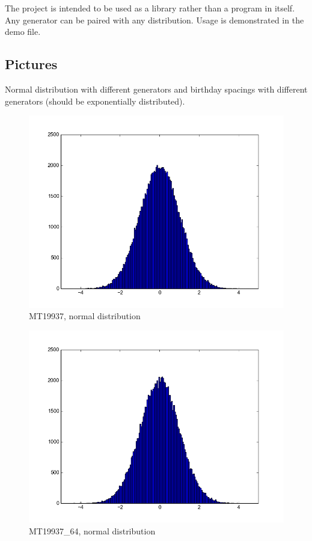 \documentclass[reprint,aip]{revtex4-1}
\begin{document}
The project is intended to be used as a library rather than a program in itself. Any generator can be paired with any distribution. Usage is demonstrated in the demo file.

\subsection{Pictures}

Normal distribution with different generators and birthday spacings with different generators (should be exponentially distributed).

\begin{figure}[h]
\includegraphics{normal-mt19937.png}
\caption{MT19937, normal distribution}
\end{figure}

\begin{figure}[h]
\includegraphics{normal-mt19937_64.png}
\caption{MT19937\_64, normal distribution}
\end{figure}
\end{document}
